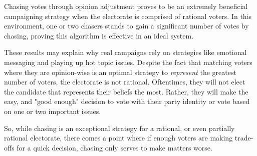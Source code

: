 Chasing votes through opinion adjustment proves to be an extremely beneficial
campaigning strategy when the electorate is comprised of rational voters. In
this environment, one or two chasers stands to gain a significant number of
votes by chasing, proving this algorithm is effective in an ideal system.

These results may explain why real campaigns rely on strategies like emotional
messaging and playing up hot topic issues. Despite the fact that matching
voters where they are opinion-wise is an optimal strategy to \textit{represent} 
the greatest number of voters, the electorate is not rational. Oftentimes, they
will not elect the candidate that represents their beliefs the most. Rather,
they will make the easy, and "good enough" decision to vote with their party
identity or vote based on one or two important issues. 

So, while chasing is an exceptional strategy for a rational, or even partially
rational electorate, there comes a point where if enough voters are making
trade-offs for a quick decision, chasing only serves to make matters worse. 